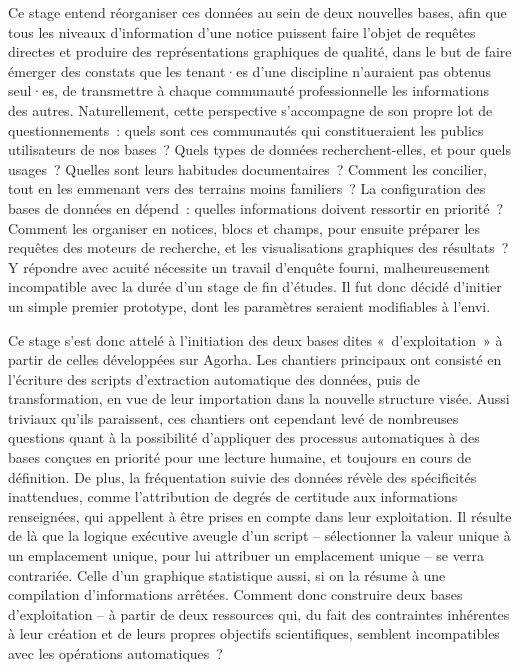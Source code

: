 \documentclass[a4paper,12pt, twoside]{book}
\begin{document}
Ce stage entend réorganiser ces données au sein de deux nouvelles bases, afin que tous les niveaux d’information d’une notice puissent faire l’objet de requêtes directes et produire des représentations graphiques de qualité, dans le but de faire émerger des constats que les tenant·es d’une discipline n’auraient pas obtenus seul·es, de transmettre à chaque communauté professionnelle les informations des autres. Naturellement, cette perspective s’accompagne de son propre lot de questionnements~: quels sont ces communautés qui constitueraient les publics utilisateurs de nos bases~? Quels types de données recherchent-elles, et pour quels usages~? Quelles sont leurs habitudes documentaires~? Comment les concilier, tout en les emmenant vers des terrains moins familiers~? La configuration des bases de données en dépend~: quelles informations doivent ressortir en priorité~? Comment les organiser en notices, blocs et champs, pour ensuite préparer les requêtes des moteurs de recherche, et les visualisations graphiques des résultats~? Y répondre avec acuité nécessite un travail d’enquête fourni, malheureusement incompatible avec la durée d’un stage de fin d’études. Il fut donc décidé d’initier un simple premier prototype, dont les paramètres seraient modifiables à l’envi.

Ce stage s’est donc attelé à l’initiation des deux bases dites «~d’exploitation~» à partir de celles développées sur Agorha. Les chantiers principaux ont consisté en l’écriture des scripts d’extraction automatique des données, puis de transformation, en vue de leur importation dans la nouvelle structure visée. Aussi triviaux qu’ils paraissent, ces chantiers ont cependant levé de nombreuses questions quant à la possibilité d’appliquer des processus automatiques à des bases conçues en priorité pour une lecture humaine, et toujours en cours de définition. De plus, la fréquentation suivie des données révèle des spécificités inattendues, comme l’attribution de degrés de certitude aux informations renseignées, qui appellent à être prises en compte dans leur exploitation. Il résulte de là que la logique exécutive aveugle d’un script -- sélectionner la valeur unique à un emplacement unique, pour lui attribuer un emplacement unique -- se verra contrariée. Celle d’un graphique statistique aussi, si on la résume à une compilation d’informations arrêtées. Comment donc construire deux bases d’exploitation -- à partir de deux ressources qui, du fait des contraintes inhérentes à leur création et de leurs propres objectifs scientifiques, semblent incompatibles avec les opérations automatiques~?
\end{document}
